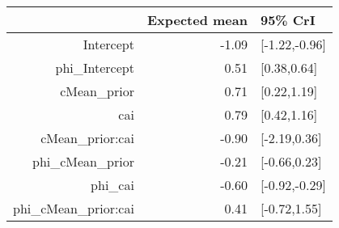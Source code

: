 \begin{tabular}{rrl}
  \hline
 & Expected mean & 95\% CrI \\ 
  \hline
Intercept & -1.09 & [-1.22,-0.96] \\ 
  phi\_Intercept & 0.51 & [0.38,0.64] \\ 
  cMean\_prior & 0.71 & [0.22,1.19] \\ 
  cai & 0.79 & [0.42,1.16] \\ 
  cMean\_prior:cai & -0.90 & [-2.19,0.36] \\ 
  phi\_cMean\_prior & -0.21 & [-0.66,0.23] \\ 
  phi\_cai & -0.60 & [-0.92,-0.29] \\ 
  phi\_cMean\_prior:cai & 0.41 & [-0.72,1.55] \\ 
   \hline
\end{tabular}

